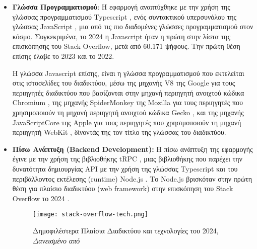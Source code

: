 \begin{itemize}
\item
  \textbf{Γλώσσα Προγραμματισμού}: Η εφαρμογή αναπτύχθηκε με την χρήση
  της γλώσσας προγραμματισμού \textlatin{Typescript} \cite{typescript},
  ενός συντακτικού υπερσυνόλου της γλώσσας \textlatin{JavaScript}
  \cite{javascript}, μια από τις πιο διαδομένες γλώσσες προγραμματισμού
  στον κόσμο. \cite{tiobe, languagechart} Συγκεκριμένα, το 2024 η
  \textlatin{Javascript} ήταν η πρώτη στην λίστα της επισκόπησης του
  \textlatin{Stack Overflow}, μετά από 60.171 ψήφους. \cite{so2024} Την
  πρώτη θέση επίσης έλαβε το 2023 και το 2022. \cite{so2022,so2023}

  Η γλώσσα \textlatin{Javascript} επίσης, είναι η γλώσσα προγραμματισμού
  που εκτελείται στις ιστοσελίδες του διαδικτύου, μέσω της μηχανής
  \textlatin{V8} της \textlatin{Google} \cite{v8} για τους περιηγητές
  διαδικτύου που βασίζονται στην μηχανή περιηγητή ανοιχτού κώδικα
  \textlatin{Chromium} \cite{chromium}, της μηχανής
  \textlatin{SpiderMonkey} της \textlatin{Mozilla} \cite{spidermonkey}
  για τους περιηγητές που χρησιμοποιούν τη μηχανή περιηγητή ανοιχτού
  κώδικα \textlatin{Gecko} \cite{gecko}, και της μηχανής
  \textlatin{JavaScriptCore} της \textlatin{Apple} \cite{javascriptcore}
  για τους περιηγητές που χρησιμοποιούν τη μηχανή περιηγητή
  \textlatin{WebKit} \cite{webkit}, δίνοντάς της τον τίτλο της γλώσσας
  του διαδικτύου.
\item
  \textbf{Πίσω Ανάπτυξη (\textlatin{Backend Development}):} Η πίσω
  ανάπτυξη της εφαρμογής έγινε με την χρήση της βιβλιοθήκης
  \textlatin{tRPC} \cite{trpc}, μιας βιβλιοθήκης που παρέχει την
  δυνατότητα δημιουργίας \textlatin{API} με την χρήση της γλώσσας
  \textlatin{Typescript} και του περιβάλλοντος εκτέλεσης
  (\textlatin{runtime}) \textlatin{Node.js} \cite{node}. Το
  \textlatin{Node.js} βρισκόταν στην πρώτη θέση για πλαίσιο διαδικτύου
  (\textlatin{web framework}) στην επισκόπηση του \textlatin{Stack
    Overflow} το 2024 \cite{so2024}.
  \begin{figure}[H]
    \begin{center}
      \texttt{[image: stack-overflow-tech.png]}
      \caption{Δημοφιλέστερα Πλαίσια Διαδικτύου και τεχνολογίες του
        2024, \textit{Δανεισμένο από \cite{so2024}}}
    \end{center}
    \label{fig:SO2024FRAMEWORKS}
  \end{figure}


\end{itemize}
